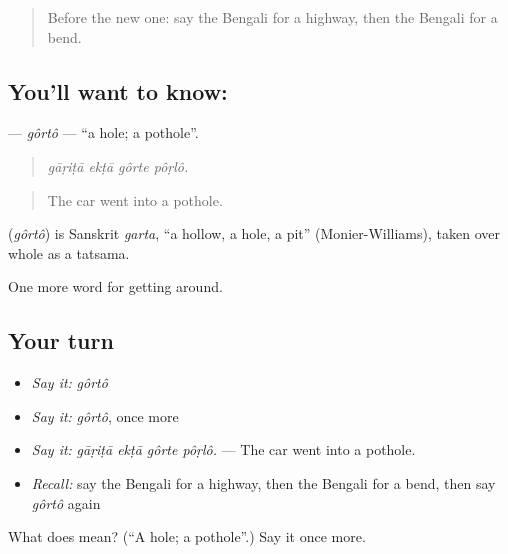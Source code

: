 \label{lesson:BN-C390-gorto}



\begin{quote}
Before the new one: say the Bengali for a highway, then the Bengali for a bend.
\end{quote}

\subsection*{You'll want to know: }
\textbf{} — \emph{gôrtô} — \textquotedblleft{}a hole; a pothole\textquotedblright{}.

\begin{quote}
   
\end{quote}

\begin{quote}
\emph{gāṛiṭā ekṭā gôrte pôṛlô.}
\end{quote}

\begin{quote}
The car went into a pothole.
\end{quote}

\begin{cousinweb}
\textbf{} (\emph{gôrtô}) is Sanskrit \emph{garta}, \textquotedblleft{}a hollow, a hole, a pit\textquotedblright{} (Monier-Williams), taken over whole as a tatsama.
\end{cousinweb}

\begin{grammarlens}[title={What you've built}]
One more word for getting around.
\end{grammarlens}

\subsection*{Your turn}
\begin{itemize}
\raggedright
  \item \emph{Say it:} \emph{gôrtô}
  \item \emph{Say it:} \emph{gôrtô}, once more
  \item \emph{Say it:} \emph{gāṛiṭā ekṭā gôrte pôṛlô.} — The car went into a pothole.
  \item \emph{Recall:} say the Bengali for a highway, then the Bengali for a bend, then say \emph{gôrtô} again
\end{itemize}

\begin{tcolorbox}[breakable,colback=teal!4,colframe=teal!35!black,title={Before you move on}]
What does  mean? (\textquotedblleft{}A hole; a pothole\textquotedblright{}.) Say it once more.
\end{tcolorbox}
